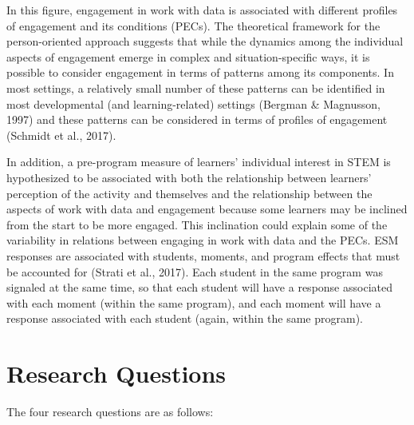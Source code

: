 \documentclass[]{book}
\theoremstyle{definition}
\theoremstyle{definition}
\theoremstyle{definition}
\theoremstyle{remark}
\begin{document}
In this figure, engagement in work with data is associated with
different profiles of engagement and its conditions (PECs). The
theoretical framework for the person-oriented approach suggests that
while the dynamics among the individual aspects of engagement emerge in
complex and situation-specific ways, it is possible to consider
engagement in terms of patterns among its components. In most settings,
a relatively small number of these patterns can be identified in most
developmental (and learning-related) settings (Bergman \& Magnusson,
1997) and these patterns can be considered in terms of profiles of
engagement (Schmidt et al., 2017).

In addition, a pre-program measure of learners' individual interest in
STEM is hypothesized to be associated with both the relationship between
learners' perception of the activity and themselves and the relationship
between the aspects of work with data and engagement because some
learners may be inclined from the start to be more engaged. This
inclination could explain some of the variability in relations between
engaging in work with data and the PECs. ESM responses are associated
with students, moments, and program effects that must be accounted for
(Strati et al., 2017). Each student in the same program was signaled at
the same time, so that each student will have a response associated with
each moment (within the same program), and each moment will have a
response associated with each student (again, within the same program).

\section{Research Questions}\label{research-questions}

The four research questions are as follows:
\end{document}

